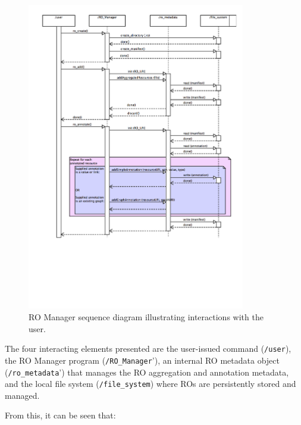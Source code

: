 \begin{figure}
\begin{center}
\includegraphics[width=0.85\textwidth]{Figures/RO_Manager_seq.png}
\end{center}
\caption{RO Manager sequence diagram illustrating interactions with the user.}
\label{fig:romanagersequencediagram}
\end{figure}


The four interacting elements presented are the user-issued command (\texttt{/user}), the RO Manager program (\texttt{/RO\_Manager}'), an internal RO metadata object (\texttt{/ro\_metadata}') that manages the RO aggregation and annotation metadata, and the local file system (\texttt{/file\_system}) where ROs are persistently stored and managed.

From this, it can be seen that:

